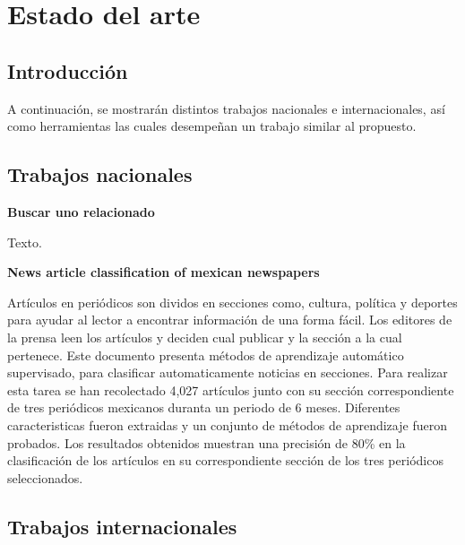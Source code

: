 
\chapter{Estado del arte}

\section{Introducción}

A continuación, se mostrarán distintos trabajos nacionales e internacionales, así como herramientas las cuales desempeñan un trabajo similar al propuesto.

\section{Trabajos nacionales}

\begin{large}
	 \textbf{Buscar uno relacionado}\\
\end{large}

Texto.\\

\begin{large}
	 \textbf{News article classification of mexican newspapers}\\
\end{large}

Artículos en periódicos son dividos en secciones como, cultura, política y deportes para ayudar al lector a encontrar información de una forma fácil. Los editores de la prensa leen los artículos y deciden cual publicar y la sección a la cual pertenece. Este documento presenta métodos de aprendizaje automático supervisado, para clasificar automaticamente noticias en secciones. Para realizar esta tarea se han recolectado 4,027 artículos junto con su sección correspondiente de tres periódicos mexicanos duranta un periodo de 6 meses. Diferentes caracteristicas fueron extraidas y un conjunto de métodos de aprendizaje fueron probados. Los resultados obtenidos muestran una precisión de 80\% en la clasificación de los artículos en su correspondiente sección de los tres periódicos seleccionados.\\



\section{Trabajos internacionales}


